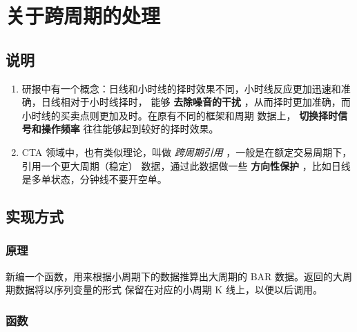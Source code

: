 \documentclass[11pt]{ctexart}
\date{\today}
\title{}
\begin{document}
\tableofcontents

\section{关于跨周期的处理}
\label{sec:orgcea9333}

\subsection{说明}
\label{sec:orgf13e268}

\begin{enumerate}
\item 研报中有一个概念：日线和小时线的择时效果不同，小时线反应更加迅速和准确，日线相对于小时线择时，
能够 \textbf{去除噪音的干扰} ，从而择时更加准确，而小时线的买卖点则更加及时。在原有不同的框架和周期
数据上， \textbf{切换择时信号和操作频率} 往往能够起到较好的择时效果。
\item CTA 领域中，也有类似理论，叫做 \emph{跨周期引用} ，一般是在额定交易周期下，引用一个更大周期（稳定）
数据，通过此数据做一些 \textbf{方向性保护} ，比如日线是多单状态，分钟线不要开空单。
\end{enumerate}

\subsection{实现方式}
\label{sec:org2bc8983}


\subsubsection{原理}
\label{sec:orgafa4ca1}

新编一个函数，用来根据小周期下的数据推算出大周期的 BAR 数据。返回的大周期数据将以序列变量的形式
保留在对应的小周期 K 线上，以便以后调用。

\subsubsection{函数}
\label{sec:org824b344}
\end{document}
